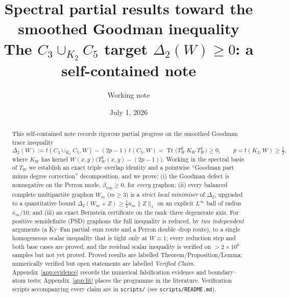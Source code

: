 \documentclass[11pt]{article}
\title{Spectral partial results toward the smoothed Goodman inequality\\
\large The $C_3\cup_{K_2}C_5$ target $\Delta_2(W)\ge0$: a self-contained note}
\author{Working note}
\date{July 1, 2026}
\theoremstyle{definition}
\newcommand{\Tr}{\operatorname{Tr}}
\newcommand{\tw}{T_W}
\newcommand{\kw}{K_W}
\newcommand{\Wm}{W_m}
\newcommand{\Lone}[1]{\lVert #1\rVert_1}
\begin{document}
\maketitle

\begin{abstract}
This self-contained note records rigorous partial progress on the smoothed
Goodman trace inequality
\[
  \Delta_2(W):=t(C_3\cup_{K_2}C_5,W)-(2p-1)\,t(C_5,W)
  =\Tr\!\big(\tw^2\,\kw\,\tw^2\big)\ge0,
  \qquad p=t(K_2,W)\ge\tfrac12,
\]
where $\kw$ has kernel $W(x,y)\big(\tw^2(x,y)-(2p-1)\big)$.  Working in the
spectral basis of $\tw$ we establish an exact triple--overlap identity and a
pointwise ``Goodman part minus degree correction'' decomposition, and we prove:
(i) the Goodman defect is nonnegative on the Perron mode, $\beta_{\mathrm{top}}\ge0$,
for \emph{every} graphon; (ii) every balanced complete multipartite graphon
$\Wm$ ($m\ge3$) is a \emph{strict local minimiser} of $\Delta_2$, upgraded to a
quantitative bound $\Delta_2(\Wm+Z)\ge\tfrac12\kappa_m\Lone Z$ on an explicit
$L^\infty$ ball of radius $\kappa_m/10$; and (iii) an exact Bernstein certificate
on the rank--three degenerate axis.  For positive semidefinite (PSD) graphons the
full inequality is reduced, by \emph{two independent} arguments (a Ky--Fan
partial--sum route and a Perron double--drop route), to a single homogeneous
scalar inequality that is tight only at $W\equiv1$; every reduction step and both
base cases are proved, and the residual scalar inequality is verified on
$>2\times10^6$ samples but not yet proved.  Proved results are labelled
Theorem/Proposition/Lemma; numerically verified but open statements are labelled
\emph{Verified Claim}.  Appendix~\ref{app:evidence} records the numerical
falsification evidence and boundary--atom tests; Appendix~\ref{app:lit} places the
programme in the literature.  Verification scripts accompanying every claim are in
\texttt{scripts/} (see \texttt{scripts/README.md}).
\end{abstract}

\begin{center}
\end{center}
\end{document}
